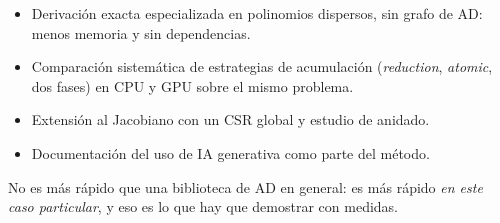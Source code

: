 \begin{itemize}
\item Derivación exacta especializada en polinomios dispersos, sin grafo de AD: menos memoria y sin dependencias.
\item Comparación sistemática de estrategias de acumulación (\emph{reduction}, \emph{atomic}, dos fases) en CPU y GPU sobre el mismo problema.
\item Extensión al Jacobiano con un CSR global y estudio de anidado.
\item Documentación del uso de IA generativa como parte del método.
\end{itemize}
No es más rápido que una biblioteca de AD en general: es más rápido \emph{en este caso particular}, y eso es lo que hay que demostrar con medidas.
\clearpage
